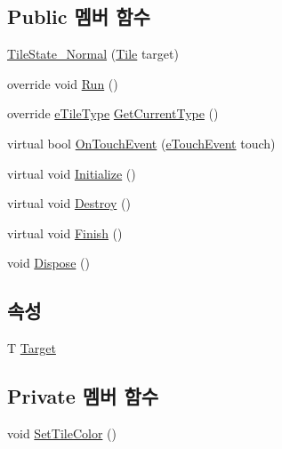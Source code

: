 \subsection*{Public 멤버 함수}
\begin{DoxyCompactItemize}
\item 
\hyperlink{class_tile_1_1_tile_state___normal_a521cdb030b6ad4b3827cd37592a79406}{Tile\+State\+\_\+\+Normal} (\hyperlink{class_tile}{Tile} target)
\item 
override void \hyperlink{class_tile_1_1_tile_state___normal_acf613382b6ddeff2fcc226d8caeb0b53}{Run} ()
\item 
override \hyperlink{_tile_8cs_a271bc07be325bca511bcb747e0ff2fda}{e\+Tile\+Type} \hyperlink{class_tile_1_1_tile_state___normal_ad649955a61ea5ca2158b3c379ea8c505}{Get\+Current\+Type} ()
\item 
virtual bool \hyperlink{class_tile_1_1_tile_state_a8687f7cb0e2c1a436c5ac395f4f6d07a}{On\+Touch\+Event} (\hyperlink{_touch_manager_8cs_ae33e321a424fe84ba8b2fdb81ad40a68}{e\+Touch\+Event} touch)
\item 
virtual void \hyperlink{class_m_c_n_1_1_state_a8eabaffe047e6dccd5c5d8aed7bf218a}{Initialize} ()
\item 
virtual void \hyperlink{class_m_c_n_1_1_state_a32af22a6a0a979d3b3a80225426aa839}{Destroy} ()
\item 
virtual void \hyperlink{class_m_c_n_1_1_state_a6de4f94b23916fcd05f589759da9ac3f}{Finish} ()
\item 
void \hyperlink{class_m_c_n_1_1_state_a6c53b2eda47e718ff469fd76a95cf02a}{Dispose} ()
\end{DoxyCompactItemize}
\subsection*{속성}
\begin{DoxyCompactItemize}
\item 
T \hyperlink{class_m_c_n_1_1_state_a93ba2fd920292031bd6e65b1dc505cb3}{Target}
\end{DoxyCompactItemize}
\subsection*{Private 멤버 함수}
\begin{DoxyCompactItemize}
\item 
void \hyperlink{class_tile_1_1_tile_state___normal_a81d8bc6e280e6143ff42a292e863307e}{Set\+Tile\+Color} ()
\end{DoxyCompactItemize}



